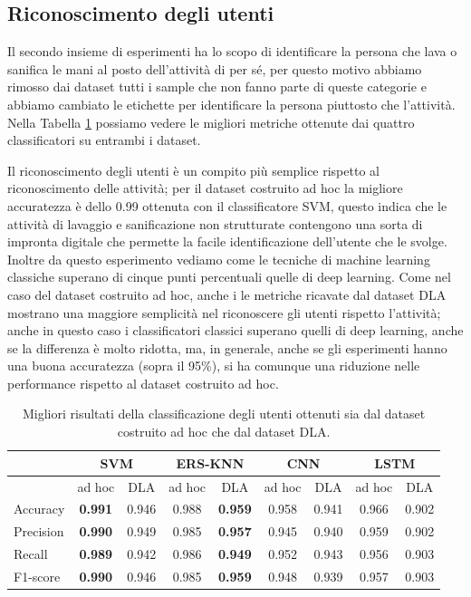\subsection{Riconoscimento degli utenti}
\label{ssec:riconoscimento-degli-utenti}

Il secondo insieme di esperimenti ha lo scopo di identificare la persona che lava o sanifica le mani al posto dell'attività di per sé, per questo motivo abbiamo rimosso dai dataset tutti i sample che non fanno parte di queste categorie e abbiamo cambiato le etichette per identificare la persona piuttosto che l'attività. Nella Tabella \ref{tab:person-classification} possiamo vedere le migliori metriche ottenute dai quattro classificatori su entrambi i dataset. 

Il riconoscimento degli utenti è un compito più semplice rispetto al riconoscimento delle attività; per il dataset costruito ad hoc la migliore accuratezza è dello 0.99 ottenuta con il classificatore SVM, questo indica che le attività di lavaggio e sanificazione non strutturate contengono una sorta di impronta digitale che permette la facile identificazione dell'utente che le svolge. Inoltre da questo esperimento vediamo come le tecniche di machine learning classiche superano di cinque punti percentuali quelle di deep learning. Come nel caso del dataset costruito ad hoc, anche i le metriche ricavate dal dataset DLA mostrano una maggiore semplicità nel riconoscere gli utenti rispetto l'attività; anche in questo caso i classificatori classici superano quelli di deep learning, anche se la differenza è molto ridotta, ma, in generale, anche se gli esperimenti hanno una buona accuratezza (sopra il 95\%), si ha comunque una riduzione nelle performance rispetto al dataset costruito ad hoc.

\begin{table}
    \centering
    \begin{tabular}{l | c c | c c | c c | c c}
        \hline
        & \multicolumn{2}{c}{SVM} & \multicolumn{2}{c}{ERS-KNN} & \multicolumn{2}{c}{CNN} & \multicolumn{2}{c}{LSTM} \\
        \hline
        & ad hoc & DLA & ad hoc & DLA & ad hoc & DLA & ad hoc & DLA \\
        \hline
        Accuracy  & \textbf{0.991} & 0.946 & 0.988 & \textbf{0.959} & 0.958 & 0.941 & 0.966 & 0.902 \\
        Precision & \textbf{0.990} & 0.949 & 0.985 & \textbf{0.957} & 0.945 & 0.940 & 0.959 & 0.902 \\
        Recall    & \textbf{0.989} & 0.942 & 0.986 & \textbf{0.949} & 0.952 & 0.943 & 0.956 & 0.903 \\
        F1-score  & \textbf{0.990} & 0.946 & 0.985 & \textbf{0.959} & 0.948 & 0.939 & 0.957 & 0.903 \\
        \hline
    \end{tabular}
    \caption{Migliori risultati della classificazione degli utenti ottenuti sia dal dataset costruito ad hoc che dal dataset DLA.}
    \label{tab:person-classification}
\end{table}

